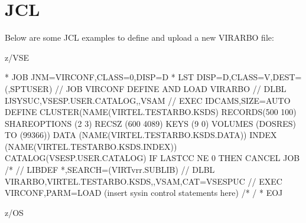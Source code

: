 \documentclass[letterpaper,10pt,english]{sphinxmanual}
\begin{document}
\section{JCL}
\label{\detokenize{Installation_Guide:jcl}}\label{\detokenize{Installation_Guide:index-154}}
\sphinxAtStartPar
Below are some JCL examples to define and upload a new VIRARBO file:\sphinxhyphen{}

\sphinxAtStartPar
z/VSE

\begin{sphinxVerbatim}[commandchars=\\\{\}]
* \PYGZdl{}\PYGZdl{} JOB JNM=VIRCONF,CLASS=0,DISP=D
* \PYGZdl{}\PYGZdl{} LST DISP=D,CLASS=V,DEST=(,SPTUSER)
// JOB VIRCONF DEFINE AND LOAD VIRARBO
// DLBL IJSYSUC,\PYGZsq{}VSESP.USER.CATALOG\PYGZsq{},,VSAM
// EXEC IDCAMS,SIZE=AUTO
        DEFINE CLUSTER(NAME(VIRTEL.TESTARBO.KSDS) \PYGZhy{}
              RECORDS(500 100) SHAREOPTIONS (2 3) \PYGZhy{}
              RECSZ (600 4089) KEYS (9 0) \PYGZhy{}
              VOLUMES (DOSRES) TO (99366))\PYGZhy{}
        DATA (NAME(VIRTEL.TESTARBO.KSDS.DATA)) \PYGZhy{}
        INDEX (NAME(VIRTEL.TESTARBO.KSDS.INDEX)) \PYGZhy{}
              CATALOG(VSESP.USER.CATALOG)
IF LASTCC NE 0 THEN CANCEL JOB
/*
// LIBDEF *,SEARCH=(VIRTvrr.SUBLIB)
// DLBL VIRARBO,\PYGZsq{}VIRTEL.TESTARBO.KSDS\PYGZsq{},,VSAM,CAT=VSESPUC
// EXEC VIRCONF,PARM=\PYGZsq{}LOAD\PYGZsq{}
        (insert sysin control statements here)
/*
/\PYGZam{}
* \PYGZdl{}\PYGZdl{} EOJ
\end{sphinxVerbatim}

\sphinxAtStartPar
{}

\ignorespaces 
\sphinxAtStartPar
z/OS
\end{document}
